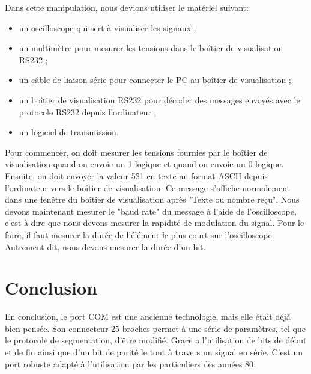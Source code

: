 \documentclass[a4paper]{article}
\begin{document}
Dans cette manipulation, nous devions utiliser le matériel suivant:
\begin{itemize}
    \item un oscilloscope qui sert à visualiser les signaux ;
    \item un multimètre pour mesurer les tensions dans le boîtier de visualisation RS232 ;
    \item un câble de liaison série pour connecter le PC au boîtier de visualisation ;
    \item un boîtier de visualisation RS232 pour décoder des messages envoyés avec le protocole RS232 depuis l’ordinateur ;
    \item un logiciel de transmission.    
\end{itemize}
Pour commencer, on doit mesurer les tensions fournies par le boîtier de visualisation quand on envoie un 1 logique et quand on envoie un 0 logique. Ensuite, on doit envoyer la valeur 521 en texte au format ASCII depuis l’ordinateur vers le boîtier de visualisation. Ce message s’affiche normalement dans une fenêtre du boîtier de visualisation après "Texte ou nombre reçu". Nous devons maintenant mesurer le "baud rate" du message à l’aide de l’oscilloscope, c’est à dire que nous devons mesurer la rapidité de modulation du signal. Pour le faire, il faut mesurer la durée de l’élément le plus court sur l’oscilloscope. Autrement dit, nous devons mesurer la durée d’un bit.















\section{Conclusion}





En conclusion, le port COM est une ancienne technologie, mais elle était déjà bien pensée. Son connecteur 25 broches permet à une série de paramètres, tel que le protocole de segmentation, d’être modifié. Grace a l’utilisation de bits de début et de fin ainsi que d’un bit de parité le tout à travers un signal en série. C’est un port robuste adapté à l’utilisation par les particuliers des années 80.
\end{document}
